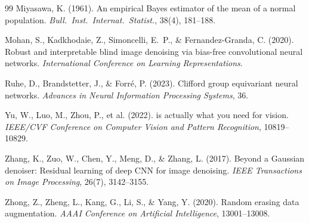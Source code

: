 \documentclass{article}
\begin{document}
\begin{thebibliography}{99}
Miyasawa, K. (1961).
\newblock An empirical {Bayes} estimator of the mean of a normal population.
\newblock \emph{Bull.\ Inst.\ Internat.\ Statist.}, 38(4), 181--188.

Mohan, S., Kadkhodaie, Z., Simoncelli, E.~P., \& Fernandez-Granda, C. (2020).
\newblock Robust and interpretable blind image denoising via bias-free convolutional neural networks.
\newblock \emph{International Conference on Learning Representations}.

Ruhe, D., Brandstetter, J., \& Forr\'e, P. (2023).
\newblock Clifford group equivariant neural networks.
\newblock \emph{Advances in Neural Information Processing Systems}, 36.

Yu, W., Luo, M., Zhou, P., et al. (2022).
 is actually what you need for vision.
\newblock \emph{IEEE/CVF Conference on Computer Vision and Pattern Recognition}, 10819--10829.

Zhang, K., Zuo, W., Chen, Y., Meng, D., \& Zhang, L. (2017).
\newblock Beyond a {Gaussian} denoiser: Residual learning of deep {CNN} for image denoising.
\newblock \emph{IEEE Transactions on Image Processing}, 26(7), 3142--3155.

Zhong, Z., Zheng, L., Kang, G., Li, S., \& Yang, Y. (2020).
\newblock Random erasing data augmentation.
\newblock \emph{AAAI Conference on Artificial Intelligence}, 13001--13008.

\end{thebibliography}
\end{document}
